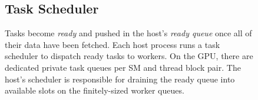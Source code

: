 \begin{figure}[htb]


\subsection{Task Scheduler}
Tasks become {\em ready} and pushed in the host's {\em ready queue} once all of their data have been fetched.
Each host process runs a task scheduler to dispatch ready tasks to workers. On the GPU, there are
dedicated private task queues per SM and thread block pair. The host's scheduler is responsible
for draining the ready queue into available slots on the finitely-sized worker queues.



\end{figure}
